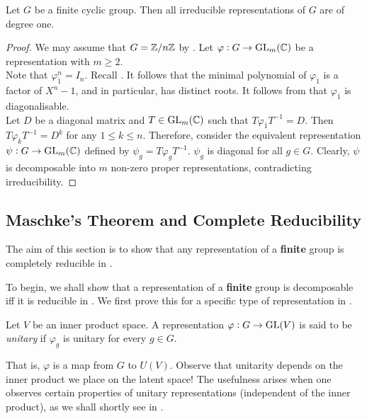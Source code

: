 			\begin{fprop}
				\label{prop: cyclic group degree one}
				Let $G$ be a finite cyclic group. Then all irreducible representations of $G$ are of degree one.
			\end{fprop}
			\begin{proof}
				We may assume that $G = \mathbb{Z}/n\mathbb{Z}$ by . Let $\varphi : G \to \operatorname{GL}_m(\mathbb{C})$ be a representation with $m \ge 2$.\\
				Note that $\varphi_{\overline{1}}^n = I_n$. Recall . It follows that the minimal polynomial of $\varphi_{\overline{1}}$ is a factor of $X^n - 1$, and in particular, has distinct roots. It follows from  that $\varphi_{\overline{1}}$ is diagonalisable.\\
				Let $D$ be a diagonal matrix and $T \in \operatorname{GL}_m(\mathbb{C})$ such that $T\varphi_{\overline{1}}T^{-1} = D$.
				Then $T\varphi_{\overline{k}}T^{-1} = D^k$
				for any $1 \le k \le n$. Therefore, consider the equivalent representation $\psi : G \to \operatorname{GL}_m(\mathbb{C})$ defined by $\psi_g = T\varphi_g T^{-1}$. $\psi_g$ is diagonal for all $g \in G$. Clearly, $\psi$ is decomposable into $m$ non-zero proper representations, contradicting irreducibility.
			\end{proof}

	\subsection{Maschke's Theorem and Complete Reducibility}

			The aim of this section is to show that any representation of a \textbf{finite} group is completely reducible in .

			To begin, we shall show that a representation of a \textbf{finite} group is decomposable iff it is reducible in .
			We first prove this for a specific type of representation in .


			\begin{fdef}[Unitary]
				Let $V$ be an inner product space. A representation $\varphi : G \to \operatorname{GL}(V)$ is said to be \emph{unitary} if $\varphi_g$ is unitary for every $g \in G$.
			\end{fdef}

			That is, $\varphi$ is a map from $G$ to $U(V)$. Observe that unitarity depends on the inner product we place on the latent space! The usefulness arises when one observes certain properties of unitary representations (independent of the inner product), as we shall shortly see in .

